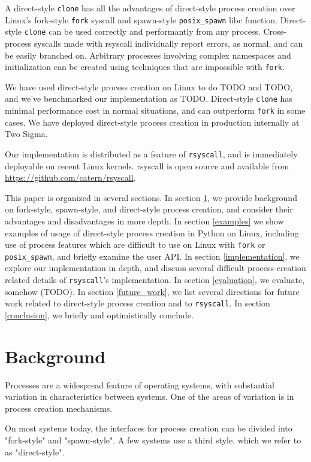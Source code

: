 \documentclass{acmart}
\begin{document}
A direct-style \texttt{clone} has all the advantages of direct-style process creation
over Linux's fork-style \texttt{fork} syscall and spawn-style \texttt{posix\_spawn} libc function.
Direct-style \texttt{clone} can be used correctly and performantly from any process.
Cross-process syscalls made with rsyscall individually report errors, as normal, and can be easily branched on.
Arbitrary processes involving complex namespaces and initialization can be created
using techniques that are impossible with \texttt{fork}.

We have used direct-style process creation on Linux to do TODO and TODO,
and we've benchmarked our implementation as TODO.
Direct-style \texttt{clone} has minimal performance cost in normal situations,
and can outperform \texttt{fork} in some cases.
We have deployed direct-style process creation in production internally at Two Sigma.

Our implementation is distributed as a feature of \texttt{rsyscall},
and is immediately deployable on recent Linux kernels.
rsyscall is open source and available from \url{https://github.com/catern/rsyscall}.

This paper is organized in several sections.
In section \ref{background}, we provide background on fork-style, spawn-style, and direct-style process creation,
and consider their advantages and disadvantages in more depth.
In section \ref{examples} we show examples of usage of direct-style process creation in Python on Linux,
including use of process features which are difficult to use on Linux with \texttt{fork} or \texttt{posix\_spawn},
and briefly examine the user API.
In section \ref{implementation}, we explore our implementation in depth,
and discuss several difficult process-creation related details of \texttt{rsyscall}'s implementation.
In section \ref{evaluation}, we evaluate, somehow (TODO).
In section \ref{future_work},
we list several directions for future work related to direct-style process creation and to \texttt{rsyscall}.
In section \ref{conclusion}, we briefly and optimistically conclude.

\section{Background}\label{background}
Processes are a widespread feature of operating systems,
with substantial variation in characteristics between systems.
One of the areas of variation is in process creation mechanisms.

On most systems today,
the interfaces for process creation
can be divided into "fork-style" and "spawn-style".
A few systems use a third style, which we refer to as "direct-style".
\end{document}

